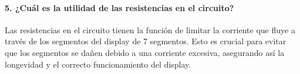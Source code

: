 \paragraph{5. ¿Cuál es la utilidad de las resistencias en el circuito?}

Las resistencias en el circuito tienen la función de limitar la corriente que fluye a través de los segmentos del display de 7 segmentos. Esto es crucial para evitar que los segmentos se dañen debido a una corriente excesiva, asegurando así la longevidad y el correcto funcionamiento del display.